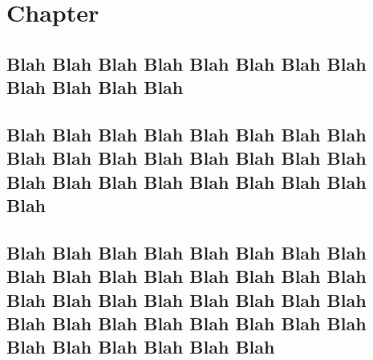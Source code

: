 \documentclass[baselinegrid,showframe,noprint,nocopyright]{uit-thesis-test}
\begin{document}
\frontmatter

\begin{abstract}
\lipsum
\end{abstract}

\begin{acknowledgement}
\lipsum
\end{acknowledgement}

\tableofcontents

\frontmatter
\layout

\mainmatter

\chapter{Chapter}
\lipsum[1-2]

\section{Blah Blah Blah Blah Blah Blah Blah Blah Blah Blah Blah Blah}
\lipsum[10-18]

\section{Blah Blah Blah Blah Blah Blah Blah Blah Blah Blah Blah Blah Blah Blah Blah Blah Blah Blah Blah Blah Blah Blah Blah Blah Blah}
\lipsum[10-18]

\section{Blah Blah Blah Blah Blah Blah Blah Blah Blah Blah Blah Blah Blah Blah Blah Blah Blah Blah Blah Blah Blah Blah Blah Blah Blah Blah Blah Blah Blah Blah Blah Blah Blah Blah Blah Blah Blah Blah}
\lipsum[10-17]
\end{document}
